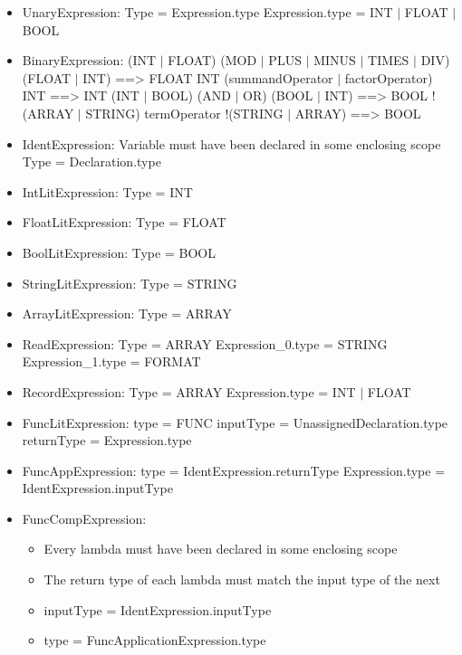 \begin{itemize}
	\item UnaryExpression:
		\subitem Type = Expression.type
		\subitem Expression.type = INT $|$ FLOAT $|$ BOOL
	\item BinaryExpression:
		\subitem (INT $|$ FLOAT) (MOD $|$ PLUS $|$ MINUS $|$ TIMES $|$ DIV) (FLOAT $|$ INT) ==> FLOAT
		\subitem INT (summandOperator $|$ factorOperator) INT ==> INT
		\subitem (INT $|$ BOOL) (AND $|$ OR) (BOOL $|$ INT) ==> BOOL
		\subitem !(ARRAY $|$ STRING) termOperator !(STRING $|$ ARRAY) ==> BOOL
	\item IdentExpression:
		\subitem Variable must have been declared in some enclosing scope
		\subitem Type = Declaration.type
	\item IntLitExpression:
		\subitem Type = INT
	\item FloatLitExpression:
		\subitem Type = FLOAT
	\item BoolLitExpression:
		\subitem Type = BOOL
	\item StringLitExpression:
		\subitem Type = STRING
	\item ArrayLitExpression:
		\subitem Type = ARRAY
	\item ReadExpression:
		\subitem Type = ARRAY
		\subitem Expression_0.type = STRING
		\subitem Expression_1.type = FORMAT
	\item RecordExpression:
		\subitem Type = ARRAY
		\subitem Expression.type = INT $|$ FLOAT
	\item FuncLitExpression:
		\subitem type = FUNC
		\subitem inputType = UnassignedDeclaration.type
		\subitem returnType = Expression.type
	\item FuncAppExpression:
		\subitem type = IdentExpression.returnType
		\subitem Expression.type = IdentExpression.inputType
	\item FuncCompExpression:
	\begin{itemize}
		\item Every lambda must have been declared in some enclosing scope
		\item The return type of each lambda must match the input type of the next 
		\item inputType = IdentExpression.inputType
		\item type = FuncApplicationExpression.type
	\end{itemize}
\end{itemize}
